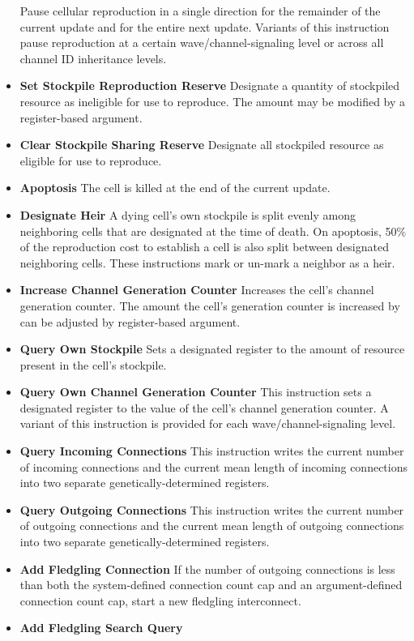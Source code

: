 \begin{itemize}
Pause cellular reproduction in a single direction for the remainder of the current update and for the entire next update.
Variants of this instruction pause reproduction at a certain wave/channel-signaling level or across all channel ID inheritance levels.
\item \textbf{Set Stockpile Reproduction Reserve}
Designate a quantity of stockpiled resource as ineligible for use to reproduce.
The amount may be modified by a register-based argument.
\item \textbf{Clear Stockpile Sharing Reserve}
Designate all stockpiled resource as eligible for use to reproduce.
\item \textbf{Apoptosis}
The cell is killed at the end of the current update.
\item \textbf{Designate Heir} A dying cell's own stockpile is split evenly among neighboring cells that are designated at the time of death.
On apoptosis, 50\% of the reproduction cost to establish a cell is also split between designated neighboring cells.
These instructions mark or un-mark a neighbor as a heir.
\item \textbf{Increase Channel Generation Counter}
Increases the cell's channel generation counter.
The amount the cell's generation counter is increased by can be adjusted by register-based argument.
\item \textbf{Query Own Stockpile}
Sets a designated register to the amount of resource present in the cell's stockpile.
\item \textbf{Query Own Channel Generation Counter}
This instruction sets a designated register to the value of the cell's channel generation counter.
A variant of this instruction is provided for each wave/channel-signaling level.
\item \textbf{Query Incoming Connections}
This instruction writes the current number of incoming connections and the current mean length of incoming connections into two separate genetically-determined registers.
\item \textbf{Query Outgoing Connections}
This instruction writes the current number of outgoing connections and the current mean length of outgoing connections into two separate genetically-determined registers.
\item \textbf{Add Fledgling Connection}
If the number of outgoing connections is less than both the system-defined connection count cap and an argument-defined connection count cap, start a new fledgling interconnect.
\item \textbf{Add Fledgling Search Query}

\end{itemize}
